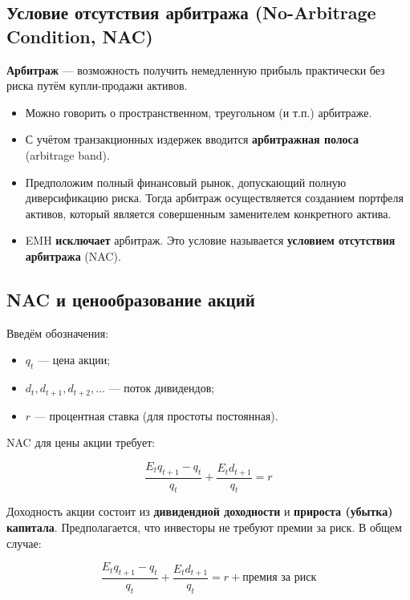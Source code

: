 \documentclass[10pt,a4paper]{article}
\begin{document}
\subsection{Условие отсутствия арбитража (No-Arbitrage Condition, NAC)}

\textbf{Арбитраж} — возможность получить немедленную прибыль практически без риска путём купли-продажи активов.
\begin{itemize}[leftmargin=1.3em]
\item Можно говорить о пространственном, треугольном (и т.п.) арбитраже.
\item С учётом транзакционных издержек вводится \textbf{арбитражная полоса} (arbitrage band).
\item Предположим полный финансовый рынок, допускающий полную диверсификацию риска. Тогда арбитраж осуществляется созданием портфеля активов, который является совершенным заменителем конкретного актива.
\item EMH \textbf{исключает} арбитраж. Это условие называется \textbf{условием отсутствия арбитража} (NAC).
\end{itemize}

\subsection{NAC и ценообразование акций}

Введём обозначения:
\begin{itemize}[leftmargin=1.3em]
\item $q_t$ — цена акции;
\item $d_t, d_{t+1}, d_{t+2},\dots$ — поток дивидендов;
\item $r$ — процентная ставка (для простоты постоянная).
\end{itemize}

NAC для цены акции требует:
\begin{formulabox}
\begin{equation}
\frac{E_t q_{t+1} - q_t}{q_t} + \frac{E_t d_{t+1}}{q_t} = r \tag{10.1}
\end{equation}
\end{formulabox}

Доходность акции состоит из \textbf{дивидендной доходности} и \textbf{прироста (убытка) капитала}. Предполагается, что инвесторы не требуют премии за риск. В общем случае:
\begin{formulabox}
\begin{equation}
\frac{E_t q_{t+1} - q_t}{q_t} + \frac{E_t d_{t+1}}{q_t} = r + \text{премия за риск} \tag{10.1$'$}
\end{equation}
\end{formulabox}
\end{document}
